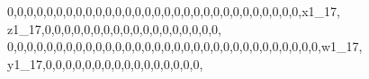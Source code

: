 \documentclass[]{article}
\newenvironment{Shaded}{\begin{snugshade}}{\end{snugshade}}
\newcommand{\DecValTok}[1]{\textcolor[rgb]{0.00,0.00,0.81}{#1}}
\newcommand{\NormalTok}[1]{#1}
\begin{document}
\begin{Shaded}
\begin{Highlighting}[]
\DecValTok{0}\NormalTok{,}\DecValTok{0}\NormalTok{,}\DecValTok{0}\NormalTok{,}\DecValTok{0}\NormalTok{,}\DecValTok{0}\NormalTok{,}\DecValTok{0}\NormalTok{,}\DecValTok{0}\NormalTok{,}\DecValTok{0}\NormalTok{,}\DecValTok{0}\NormalTok{,}\DecValTok{0}\NormalTok{,}\DecValTok{0}\NormalTok{,}\DecValTok{0}\NormalTok{,}\DecValTok{0}\NormalTok{,}\DecValTok{0}\NormalTok{,}\DecValTok{0}\NormalTok{,}\DecValTok{0}\NormalTok{,}\DecValTok{0}\NormalTok{,}\DecValTok{0}\NormalTok{,}\DecValTok{0}\NormalTok{,}\DecValTok{0}\NormalTok{,}\DecValTok{0}\NormalTok{,}\DecValTok{0}\NormalTok{,}\DecValTok{0}\NormalTok{,}\DecValTok{0}\NormalTok{,}\DecValTok{0}\NormalTok{,}\DecValTok{0}\NormalTok{,}\DecValTok{0}\NormalTok{,}\DecValTok{0}\NormalTok{,}\DecValTok{0}\NormalTok{,}\DecValTok{0}\NormalTok{,x1_}\DecValTok{17}\NormalTok{, z1_}\DecValTok{17}\NormalTok{,}\DecValTok{0}\NormalTok{,}\DecValTok{0}\NormalTok{,}\DecValTok{0}\NormalTok{,}\DecValTok{0}\NormalTok{,}\DecValTok{0}\NormalTok{,}\DecValTok{0}\NormalTok{,}\DecValTok{0}\NormalTok{,}\DecValTok{0}\NormalTok{,}\DecValTok{0}\NormalTok{,}\DecValTok{0}\NormalTok{,}\DecValTok{0}\NormalTok{,}\DecValTok{0}\NormalTok{,}\DecValTok{0}\NormalTok{,}\DecValTok{0}\NormalTok{,}\DecValTok{0}\NormalTok{,}\DecValTok{0}\NormalTok{,}\DecValTok{0}\NormalTok{,}\DecValTok{0}\NormalTok{,}
\DecValTok{0}\NormalTok{,}\DecValTok{0}\NormalTok{,}\DecValTok{0}\NormalTok{,}\DecValTok{0}\NormalTok{,}\DecValTok{0}\NormalTok{,}\DecValTok{0}\NormalTok{,}\DecValTok{0}\NormalTok{,}\DecValTok{0}\NormalTok{,}\DecValTok{0}\NormalTok{,}\DecValTok{0}\NormalTok{,}\DecValTok{0}\NormalTok{,}\DecValTok{0}\NormalTok{,}\DecValTok{0}\NormalTok{,}\DecValTok{0}\NormalTok{,}\DecValTok{0}\NormalTok{,}\DecValTok{0}\NormalTok{,}\DecValTok{0}\NormalTok{,}\DecValTok{0}\NormalTok{,}\DecValTok{0}\NormalTok{,}\DecValTok{0}\NormalTok{,}\DecValTok{0}\NormalTok{,}\DecValTok{0}\NormalTok{,}\DecValTok{0}\NormalTok{,}\DecValTok{0}\NormalTok{,}\DecValTok{0}\NormalTok{,}\DecValTok{0}\NormalTok{,}\DecValTok{0}\NormalTok{,}\DecValTok{0}\NormalTok{,}\DecValTok{0}\NormalTok{,}\DecValTok{0}\NormalTok{,}\DecValTok{0}\NormalTok{,}\DecValTok{0}\NormalTok{,w1_}\DecValTok{17}\NormalTok{, y1_}\DecValTok{17}\NormalTok{,}\DecValTok{0}\NormalTok{,}\DecValTok{0}\NormalTok{,}\DecValTok{0}\NormalTok{,}\DecValTok{0}\NormalTok{,}\DecValTok{0}\NormalTok{,}\DecValTok{0}\NormalTok{,}\DecValTok{0}\NormalTok{,}\DecValTok{0}\NormalTok{,}\DecValTok{0}\NormalTok{,}\DecValTok{0}\NormalTok{,}\DecValTok{0}\NormalTok{,}\DecValTok{0}\NormalTok{,}\DecValTok{0}\NormalTok{,}\DecValTok{0}\NormalTok{,}\DecValTok{0}\NormalTok{,}\DecValTok{0}\NormalTok{,}

\end{Highlighting}
\end{Shaded}
\end{document}
